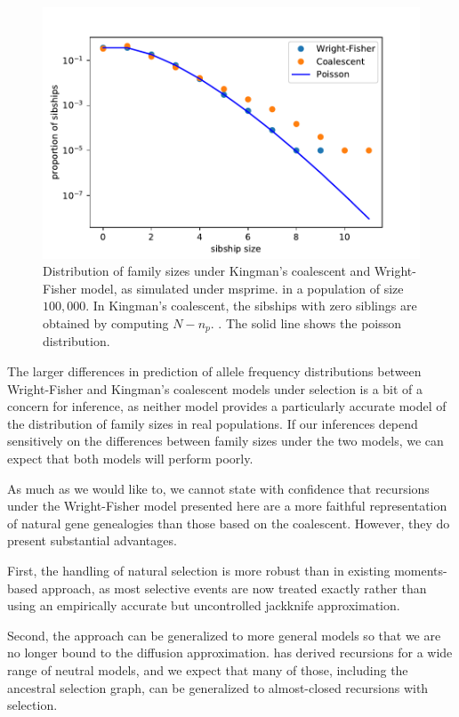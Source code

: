 \documentclass[review,nonatbib]{elsarticle}
\begin{document}
 \begin{figure}
  \centering
  \includegraphics[width=0.7\textheight]{fig/familysizes.pdf}

  \caption{Distribution of family sizes under Kingman's coalescent and Wright-Fisher model, as simulated under msprime.
  \cite{Nelson2020} in a population of size $100,000$. In Kingman's coalescent, the sibships with zero 
  siblings are obtained by computing $N-n_p.$ \label{sibships}. The solid line shows the poisson distribution.
  }

  
\end{figure}
 
The larger differences in prediction of allele frequency distributions between Wright-Fisher and Kingman's 
coalescent models under selection is a bit of a concern for inference, as neither model provides 
a particularly accurate model of the distribution of family sizes in real populations.
If our inferences depend sensitively on the differences between family sizes under the two models, 
we can expect that both models will perform poorly. 

As much as we would like to, we cannot state with confidence that recursions under the Wright-Fisher
model presented here are a more faithful representation of natural gene genealogies than those based on 
the coalescent. However, they do present substantial advantages. 

First, the handling of natural selection is more robust than in existing moments-based approach, as most selective
events are now treated exactly rather than using an empirically accurate but uncontrolled jackknife approximation. 

Second, the approach can be generalized to more general models so that we are no longer bound to the diffusion approximation. 
\cite{lessard2010recurrence} has derived recursions for a wide range of neutral models, and we expect that many of those,
including the ancestral selection graph, can be generalized to almost-closed recursions with selection. 
\end{document}
